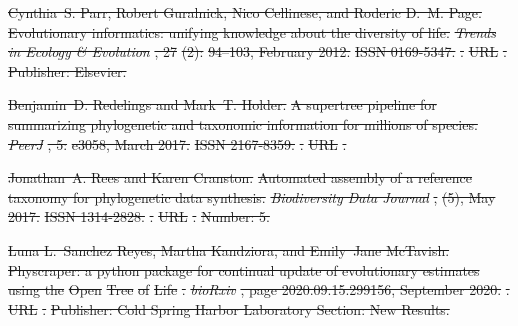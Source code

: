 \documentclass[oupdraft]{sysbio_sse}
\providecommand{\DIFdel}[1]{{\protect\color{red}\sout{#1}}}                      %
\begin{document}
\DIFdel{Cynthia~S. Parr, Robert Guralnick, Nico Cellinese, and Roderic D.~M. Page.
}%
\DIFdel{Evolutionary informatics: unifying knowledge about the diversity of
  life.
}%
\emph{\DIFdel{Trends in Ecology \& Evolution}}%
\DIFdel{, 27}%
\DIFdel{(2):}%
\DIFdel{94--103, February 2012.
}%
\DIFdel{ISSN 0169-5347.
}%
\DIFdel{.
}%
\DIFdel{URL
  }%
\DIFdel{.
}%
\DIFdel{Publisher: Elsevier.
}%

\DIFdel{Benjamin~D. Redelings and Mark~T. Holder.
}%
\DIFdel{A supertree pipeline for summarizing phylogenetic and taxonomic
  information for millions of species.
}%
\emph{\DIFdel{PeerJ}}%
\DIFdel{, 5:}%
\DIFdel{e3058, March 2017.
}%
\DIFdel{ISSN 2167-8359.
}%
\DIFdel{.
}%
\DIFdel{URL }%
\DIFdel{.
}%

\DIFdel{Jonathan~A. Rees and Karen Cranston.
}%
\DIFdel{Automated assembly of a reference taxonomy for phylogenetic data
  synthesis.
}%
\emph{\DIFdel{Biodiversity Data Journal}}%
\DIFdel{, }%
\DIFdel{(5), May 2017.
}%
\DIFdel{ISSN 1314-2828.
}%
\DIFdel{.
}%
\DIFdel{URL }%
\DIFdel{.
}%
\DIFdel{Number: 5.
}%

\DIFdel{Luna L.~Sanchez Reyes, Martha Kandziora, and Emily~Jane McTavish.
}%
\DIFdel{Physcraper: a python package for continual update of evolutionary
  estimates using the }%
\DIFdel{Open}%
\DIFdel{Tree}%
\DIFdel{of }%
\DIFdel{Life}%
\DIFdel{.
}%
\emph{\DIFdel{bioRxiv}}%
\DIFdel{, page 2020.09.15.299156, September 2020.
}%
\DIFdel{.
}%
\DIFdel{URL
  }%
\DIFdel{.
}%
\DIFdel{Publisher: Cold Spring Harbor Laboratory Section: New Results.
}%
\end{document}
